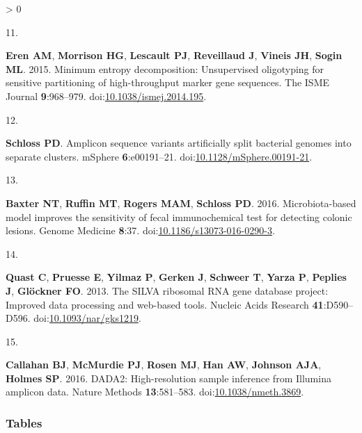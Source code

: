 \documentclass[
]{article}
\newlength{\cslhangindent}
\newlength{\csllabelwidth}
\newenvironment{CSLReferences}[2] %
 {%
  \setlength{\parindent}{0pt}
  \ifodd #1 \everypar{\setlength{\hangindent}{\cslhangindent}}\ignorespaces\fi
  \ifnum #2 > 0
  \setlength{\parskip}{#2\baselineskip}
  \fi
 }%
 {}
\newcommand{\CSLLeftMargin}[1]{\parbox[t]{\csllabelwidth}{#1}}
\newcommand{\CSLRightInline}[1]{\parbox[t]{\linewidth - \csllabelwidth}{#1}\break}
\begin{document}
\begin{CSLReferences}{0}{0}
\leavevmode\hypertarget{ref-eren2015}{}%
\CSLLeftMargin{11. }
\CSLRightInline{\textbf{Eren AM}, \textbf{Morrison HG}, \textbf{Lescault
PJ}, \textbf{Reveillaud J}, \textbf{Vineis JH}, \textbf{Sogin ML}. 2015.
Minimum entropy decomposition: Unsupervised oligotyping for sensitive
partitioning of high-throughput marker gene sequences. The ISME Journal
\textbf{9}:968--979.
doi:\href{https://doi.org/10.1038/ismej.2014.195}{10.1038/ismej.2014.195}.}

\leavevmode\hypertarget{ref-schloss}{}%
\CSLLeftMargin{12. }
\CSLRightInline{\textbf{Schloss PD}. Amplicon sequence variants
artificially split bacterial genomes into separate clusters. mSphere
\textbf{6}:e00191--21.
doi:\href{https://doi.org/10.1128/mSphere.00191-21}{10.1128/mSphere.00191-21}.}

\leavevmode\hypertarget{ref-baxter2016}{}%
\CSLLeftMargin{13. }
\CSLRightInline{\textbf{Baxter NT}, \textbf{Ruffin MT}, \textbf{Rogers
MAM}, \textbf{Schloss PD}. 2016. Microbiota-based model improves the
sensitivity of fecal immunochemical test for detecting colonic lesions.
Genome Medicine \textbf{8}:37.
doi:\href{https://doi.org/10.1186/s13073-016-0290-3}{10.1186/s13073-016-0290-3}.}

\leavevmode\hypertarget{ref-quast2013}{}%
\CSLLeftMargin{14. }
\CSLRightInline{\textbf{Quast C}, \textbf{Pruesse E}, \textbf{Yilmaz P},
\textbf{Gerken J}, \textbf{Schweer T}, \textbf{Yarza P}, \textbf{Peplies
J}, \textbf{Glöckner FO}. 2013. The SILVA ribosomal RNA gene database
project: Improved data processing and web-based tools. Nucleic Acids
Research \textbf{41}:D590--D596.
doi:\href{https://doi.org/10.1093/nar/gks1219}{10.1093/nar/gks1219}.}

\leavevmode\hypertarget{ref-callahan2016}{}%
\CSLLeftMargin{15. }
\CSLRightInline{\textbf{Callahan BJ}, \textbf{McMurdie PJ},
\textbf{Rosen MJ}, \textbf{Han AW}, \textbf{Johnson AJA}, \textbf{Holmes
SP}. 2016. DADA2: High-resolution sample inference from Illumina
amplicon data. Nature Methods \textbf{13}:581--583.
doi:\href{https://doi.org/10.1038/nmeth.3869}{10.1038/nmeth.3869}.}

\end{CSLReferences}

\setlength{\parindent}{0in}
\setlength{\leftskip}{0in}

\newpage

\hypertarget{tables}{%
\subsubsection{Tables}\label{tables}}
\end{document}
